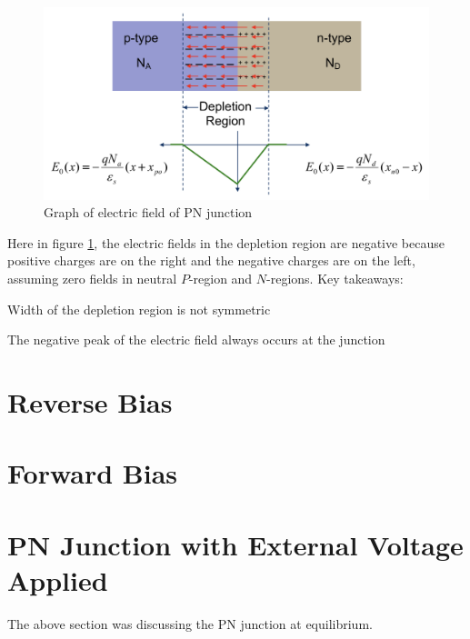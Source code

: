 \begin{figure}[H]
    \centering
    \includegraphics[scale=0.5]{figs/ch03/concentration_reader.png}
    \caption{Graph of electric field of PN junction}
    \label{fig:electric_fields_pn}
\end{figure}
Here in figure \ref{fig:electric_fields_pn}, the electric fields in the depletion region are negative because positive charges are on the right and the negative charges are on the left, assuming zero fields in neutral $P$-region and $N$-regions. Key takeaways:
\begin{pline}
    \item Width of the depletion region is not symmetric
    \item The negative peak of the electric field always occurs at the junction
\end{pline}

\section{Reverse Bias}

\section{Forward Bias}

\section{PN Junction with External Voltage Applied}
The above section was discussing the PN junction at equilibrium.

